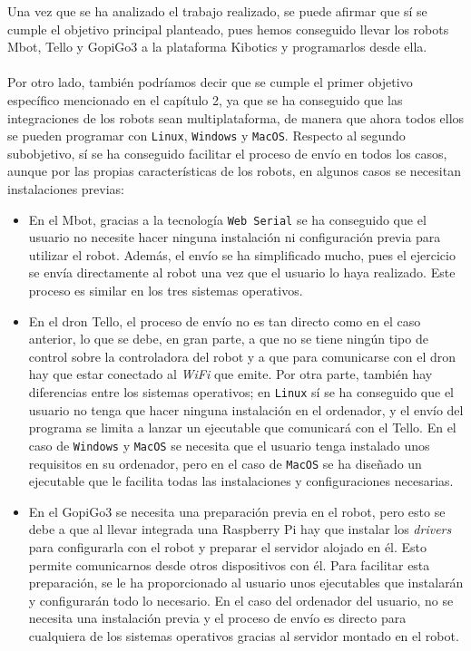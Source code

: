 \documentclass{report}
\begin{document}
Una vez que se ha analizado el trabajo realizado, se puede afirmar que sí se cumple el objetivo principal planteado, pues hemos conseguido llevar los robots Mbot, Tello y GopiGo3 a la plataforma Kibotics y programarlos desde ella.
\\
\\
Por otro lado, también podríamos decir que se cumple el primer objetivo específico mencionado en el capítulo 2, ya que se ha conseguido que las integraciones de los robots sean multiplataforma, de manera que ahora todos ellos se pueden programar con \texttt{Linux}, \texttt{Windows} y \texttt{MacOS}. Respecto al segundo subobjetivo, sí se ha conseguido facilitar el proceso de envío en todos los casos, aunque por las propias características de los robots, en algunos casos se necesitan instalaciones previas:
\begin{itemize}
	\item En el Mbot, gracias a la tecnología \texttt{Web Serial} se ha conseguido que el usuario no necesite hacer ninguna instalación ni configuración previa para utilizar el robot. Además, el envío se ha simplificado mucho, pues el ejercicio se envía directamente al robot una vez que el usuario lo haya realizado. Este proceso es similar en los tres sistemas operativos.
	\item En el dron Tello, el proceso de envío no es tan directo como en el caso anterior, lo que se debe, en gran parte, a que no se tiene ningún tipo de control sobre la controladora del robot y a que para comunicarse con el dron hay que estar conectado al \textit{WiFi} que emite. Por otra parte, también hay diferencias entre los sistemas operativos; en \texttt{Linux} sí se ha conseguido que el usuario no tenga que hacer ninguna instalación en el ordenador, y el envío del programa se limita a lanzar un ejecutable que comunicará con el Tello. En el caso de \texttt{Windows} y \texttt{MacOS} se necesita que el usuario tenga instalado unos requisitos en su ordenador, pero en el caso de \texttt{MacOS} se ha diseñado un ejecutable que le facilita todas las instalaciones y configuraciones necesarias.
	\item En el GopiGo3 se necesita una preparación previa en el robot, pero esto se debe a que al llevar integrada una Raspberry Pi hay que instalar los \textit{drivers} para configurarla con el robot y preparar el servidor alojado en él. Esto permite comunicarnos desde otros dispositivos con él. Para facilitar esta preparación, se le ha proporcionado al usuario unos ejecutables que instalarán y configurarán todo lo necesario. En el caso del ordenador del usuario, no se necesita una instalación previa y el proceso de envío es directo para cualquiera de los sistemas operativos gracias al servidor montado en el robot.
\end{itemize}
\end{document}
